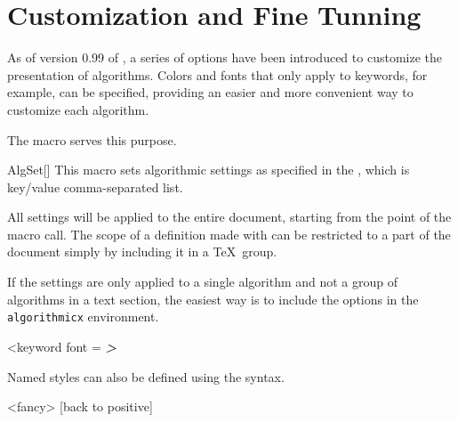 \documentclass[a4paper, 11pt]{article}
\begin{document}
\section{Customization and Fine Tunning}\label{sec:customization-and-fine-tunning}
As of version 0.99 of , a series of options have been introduced to customize the presentation of algorithms. Colors and fonts that only apply to keywords, for example, can be specified, providing an easier and more convenient way to customize each algorithm.

The  macro serves this purpose.

\begin{macro}{AlgSet}[]
    This macro sets algorithmic settings as specified in the , which is key/value comma-separated list.

    All settings will be applied to the entire document, starting from the point of the macro call. The scope of a definition made with  can be restricted to a part of the document simply by including it in a \TeX\ group.
\end{macro}

\begingroup
\begin{tcblisting}{}
    \begin{algorithmic}
        \EndIf
    \end{algorithmic}
\end{tcblisting}
\endgroup%

If the settings are only applied to a single algorithm and not a group of algorithms in a text section, the easiest way is to include the options in the \texttt{algorithmicx} environment.

\begin{tcblisting}{}
    \begin{algorithmic}<keyword font = \sffamily\bfseries\itshape>
        \EndIf
    \end{algorithmic}
\end{tcblisting}

Named styles can also be defined using the  syntax.

\begin{tcblisting}{}
    \begin{algorithmic}<fancy>
            [back to positive]
        \EndIf
    \end{algorithmic}
\end{tcblisting}
\end{document}
